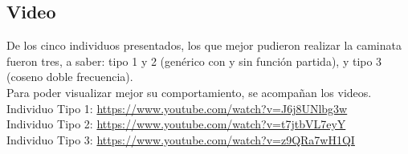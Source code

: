 \documentclass{article}
\begin{document}
\subsection{Video}
De los cinco individuos presentados, los que mejor pudieron realizar la caminata fueron tres, a saber: tipo 1 y 2 (gen\'erico con y sin funci\'on partida), y tipo 3 (coseno doble frecuencia).\\
 Para poder visualizar mejor su comportamiento, se acompa\~nan los videos.\\ 
Individuo Tipo 1: \url{https://www.youtube.com/watch?v=J6j8UNlbg3w}\\
Individuo Tipo 2: \url{https://www.youtube.com/watch?v=t7jtbVL7eyY}\\
Individuo Tipo 3: \url{https://www.youtube.com/watch?v=z9QRa7wH1QI}\\


\end{document}
